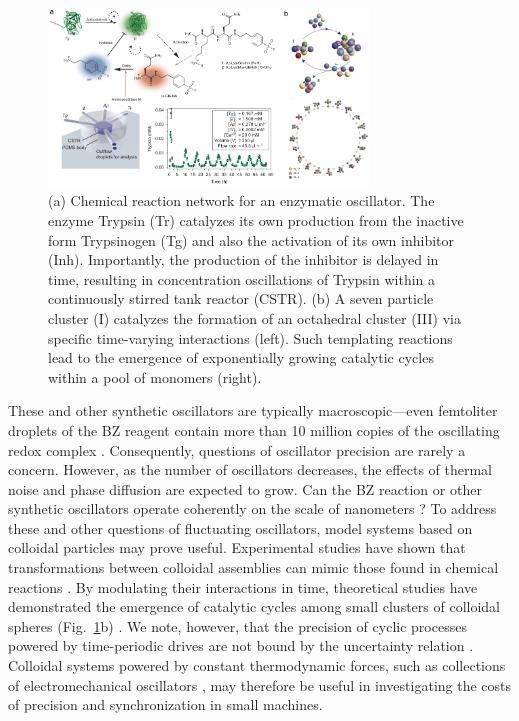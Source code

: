 \begin{appendices}
\begin{figure}[h!]
    \centering
    \includegraphics[width=8.5cm]{figures/A5_KeepingTime2.pdf}
    \caption{(a) Chemical reaction network for an enzymatic oscillator.  The enzyme Trypsin (Tr) catalyzes its own production from the inactive form Trypsinogen (Tg) and also the activation of its own inhibitor (Inh). Importantly, the production of the inhibitor is delayed in time, resulting in concentration oscillations of Trypsin within a continuously stirred tank reactor (CSTR).  (b) A seven particle cluster (I) catalyzes the formation of an octahedral cluster (III) via specific time-varying interactions (left). Such templating reactions lead to the emergence of  exponentially growing catalytic cycles within a pool of monomers (right). }
    \label{fig:KeepingTime2}
\end{figure}

These and other synthetic oscillators are typically macroscopic---even femtoliter droplets of the BZ reagent contain more than 10 million copies of the oscillating redox complex \cite{Toiya2010, Tompkins2014}. Consequently, questions of oscillator precision are rarely a concern. However, as the number of oscillators decreases, the effects of thermal noise and phase diffusion are expected to grow. Can the BZ reaction or other synthetic oscillators operate coherently on the scale of nanometers \cite{Epstein2016}?  To address these and other questions of fluctuating oscillators, model systems based on colloidal particles may prove useful. Experimental studies have shown that transformations between colloidal assemblies can mimic those found in chemical reactions \cite{Meng2010, Chen2011}. By modulating their interactions in time, theoretical studies have demonstrated the emergence of catalytic cycles among small clusters of colloidal spheres (Fig.~\ref{fig:KeepingTime2}b) \cite{Zeravcic2017, zeravcic2017colloquium}. We note, however, that the precision of cyclic processes powered by time-periodic drives are not bound by the uncertainty relation \cite{Barato2016}. Colloidal systems powered by constant thermodynamic forces, such as collections of electromechanical oscillators \cite{Dou2018}, may therefore be useful in investigating the costs of precision and synchronization in small machines.


\end{appendices}
